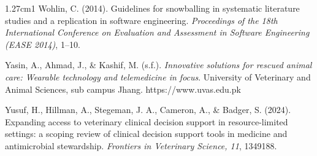 \documentclass[stu, spanish]{apa7}
\begin{document}
\begin{hangparas}{1.27cm}{1}
Wohlin, C. (2014). Guidelines for snowballing in systematic literature studies and a replication in software engineering. \textit{Proceedings of the 18th International Conference on Evaluation and Assessment in Software Engineering (EASE 2014)}, 1--10.

Yasin, A., Ahmad, J., \& Kashif, M. (s.f.). \textit{Innovative solutions for rescued animal care: Wearable technology and telemedicine in focus}. University of Veterinary and Animal Sciences, sub campus Jhang. https://www.uvas.edu.pk

Yusuf, H., Hillman, A., Stegeman, J. A., Cameron, A., \& Badger, S. (2024). Expanding access to veterinary clinical decision support in resource-limited settings: a scoping review of clinical decision support tools in medicine and antimicrobial stewardship. \textit{Frontiers in Veterinary Science, 11}, 1349188.

\end{hangparas}
\end{document}
